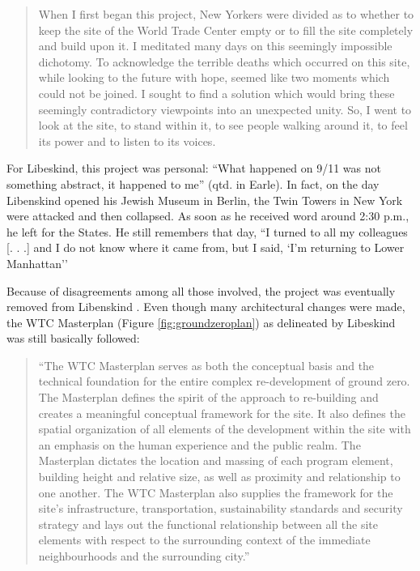 \begin{quote}
When I first began this project, New Yorkers were divided as to whether
to keep the site of the World Trade Center empty or to fill the site
completely and build upon it.  I meditated many days on this seemingly
impossible dichotomy.  To acknowledge the terrible deaths which
occurred on this site, while looking to the future with hope, seemed
like two moments which could not be joined.  I sought to find a
solution which would bring these seemingly contradictory viewpoints
into an unexpected unity.  So, I went to look at the site, to stand
within it, to see people walking around it, to feel its power and to
listen to its voices. \citep{libeskind2012}
\end{quote}

For Libeskind, this project was personal: “What happened on 9/11 was
not something abstract, it happened to me” (qtd. in
Earle). In fact, on the day Libenskind opened his
Jewish Museum in Berlin, the Twin Towers in New York were attacked and
then collapsed.  As soon as he received word around 2:30 p.m., he left
for the States.  He still  remembers that day, ``I turned
to all my colleagues [. . .] and I do not know where it came from, but
I said, `I'm returning to Lower
Manhattan{\textquotesingle}'' \citep{huffpost2012}

Because of disagreements among all those involved, the project was
eventually removed from Libenskind \citep{huffpost2012}.  Even though
many architectural changes were made, the WTC Masterplan (Figure \ref{fig:groundzeroplan}) as
delineated by Libeskind was still basically followed: 

\begin{quote}
``The WTC Masterplan serves as both the conceptual
basis and the technical foundation for the entire complex
re-development of ground zero.  The Masterplan defines the spirit of
the approach to re-building and creates a meaningful conceptual
framework for the site.  It also defines the spatial organization of
all elements of the development within the site with an emphasis on the
human experience and the public realm.  The Masterplan dictates the
location and massing of each program element, building height and
relative size, as well as proximity and relationship to one another. 
The WTC Masterplan also supplies the framework for the site’s
infrastructure, transportation, sustainability standards and security
strategy and lays out the functional relationship between all the site
elements with respect to the surrounding context of the immediate
neighbourhoods and the surrounding city.'' \citep{libeskind2011}
\end{quote}

